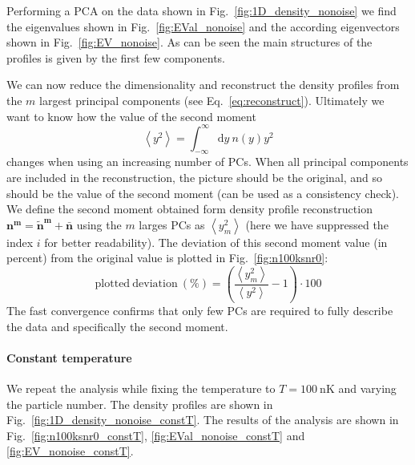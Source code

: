 \documentclass[
oneside,titlepage,numbers=noenddot,headinclude,%
footinclude=true,cleardoublepage=empty,
BCOR=5mm,paper=a4,fontsize=11pt, %
american %
]{scrartcl}
\begin{document}
Performing a PCA on the data shown in Fig.~\ref{fig:1D_density_nonoise} we find the eigenvalues shown in Fig.~\ref{fig:EVal_nonoise} and the according eigenvectors shown in Fig.~\ref{fig:EV_nonoise}. As can be seen the main structures of the profiles is given by the first few components. 

We can now reduce the dimensionality and reconstruct the density profiles from the $m$ largest principal components (see Eq.~\eqref{eq:reconstruct}). Ultimately we want to know how the value of the second moment 
\begin{equation}
	\left<y^2\right> = \int^\infty_{-\infty}\text{d}y\ n(y) y^2
\end{equation}
changes when using an increasing number of PCs. When all principal components are included in the reconstruction, the picture should be the original, and so should be the value of the second moment (can be used as a consistency check). We define the second moment obtained form density profile reconstruction $\bm{n^m} = \bm{\tilde{n}^m} + \bm{\bar{n}}$ using the $m$ larges PCs as $\left< y_m^2 \right>$ (here we have suppressed the index $i$ for better readability). The deviation of this second moment value (in percent) from the original value is plotted in Fig.~\ref{fig:n100ksnr0}:
\begin{equation}
	\mathrm{plotted\ deviation}\ (\%) = \left(\frac{\left< y_m^2 \right>}{\left< y^2 \right>} - 1\right)\cdot100
	\label{eq:dev}
\end{equation}
The fast convergence confirms that only few PCs are required to fully describe the data and specifically the second moment.


\paragraph{Constant temperature}
We repeat the analysis while fixing the temperature to \( T=\SI{100}{\nano\kelvin} \) and varying the particle number. The density profiles are shown in Fig.~\ref{fig:1D_density_nonoise_constT}. The results of the analysis are shown in Fig.~\ref{fig:n100ksnr0_constT}, \ref{fig:EVal_nonoise_constT} and \ref{fig:EV_nonoise_constT}.

\end{document}
